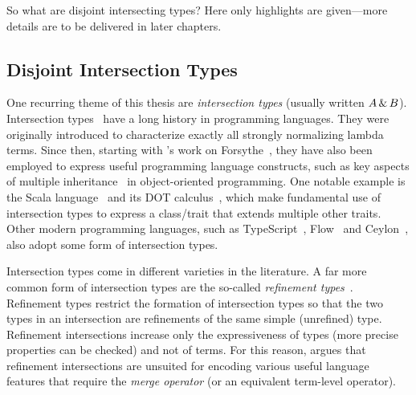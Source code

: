 So what are disjoint intersecting types? Here only highlights are given---more
details are to be delivered in later chapters.

\subsection{Disjoint Intersection Types}

One recurring theme of this thesis are \emph{intersection types} (usually written
$A \,\&\, B$). Intersection types~\citep{pottinger1980type, coppoInter} have a
long history in programming languages. They were originally introduced to
characterize exactly all strongly normalizing lambda terms. Since then, starting
with \citeauthor{reynolds1988preliminary}'s work on
Forsythe~\citep{reynolds1988preliminary}, they have also been employed to
express useful programming language constructs, such as key aspects of multiple
inheritance~\citep{compagnoni1996higher} in object-oriented programming. One
notable example is the Scala language~\citep{odersky2004overview} and its DOT
calculus~\citep{amin2012dependent}, which make fundamental use of intersection
types to express a class/trait that extends multiple other traits. Other modern
programming languages, such as TypeScript~\citep{typescript}, Flow~\citep{flow}
and Ceylon~\citep{ceylon}, also adopt some form of intersection types.

Intersection types come in different varieties in the literature. A far more
common form of intersection types are the so-called \emph{refinement types}~\citep{Freeman_1991, Davies_2000, dunfield2003type}. Refinement types
restrict the formation of intersection types so that the two types in an
intersection are refinements of the same simple (unrefined) type.
Refinement intersections increase only the expressiveness of types (more precise
properties can be checked) and not of terms. For this reason,
\citet{dunfield2014elaborating} argues that refinement intersections are unsuited
for encoding various useful language features that require the \emph{merge operator}
(or an equivalent term-level operator).

